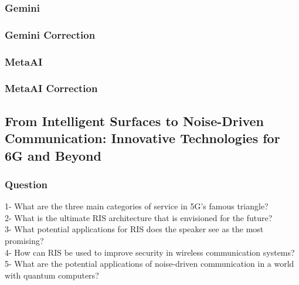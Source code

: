 \subsubsection{Gemini}
\begin{tcolorbox}[breakable]
\end{tcolorbox}
\subsubsection{Gemini Correction}
\begin{tcolorbox}[breakable]
    
\end{tcolorbox}
\subsubsection{MetaAI}
\begin{tcolorbox}[breakable]
    
\end{tcolorbox}
\subsubsection{MetaAI Correction}
\begin{tcolorbox}[breakable]
    
\end{tcolorbox}


\subsection{From Intelligent Surfaces to Noise-Driven Communication: Innovative Technologies for 6G and Beyond}
\subsubsection{Question}
\begin{tcolorbox}[breakable]
    1- What are the three main categories of service in 5G's famous triangle?\\
2- What is the ultimate RIS architecture that is envisioned for the future?\\
3- What potential applications for RIS does the speaker see as the most promising?\\
4- How can RIS be used to improve security in wireless communication systems?\\
5- What are the potential applications of noise-driven communication in a world with quantum computers?\\

\end{tcolorbox}
